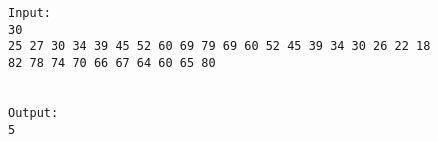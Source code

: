 \begin{verbatim}
Input:
30
25 27 30 34 39 45 52 60 69 79 69 60 52 45 39 34 30 26 22 18
82 78 74 70 66 67 64 60 65 80


Output:
5
\end{verbatim}